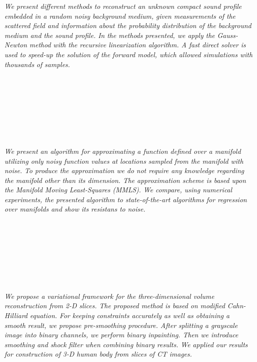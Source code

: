   \begin{multicols}{2}
    \textit{We present different methods to reconstruct an unknown compact sound profile embedded in a random noisy background medium, given measurements of the scattered field and information about the probability distribution of the background medium and the sound profile. In the methods presented, we apply the Gauss-Newton method with the recursive linearization algorithm. A fast direct solver is used to speed-up the solution of the forward model, which allowed simulations with thousands of samples.}\\
\\ 
      \\
      \\\\
      \\
      \\\\
\\
    \textit{We present an algorithm for approximating a function defined over a manifold utilizing only noisy function values at locations sampled from the manifold with noise. To produce the approximation we do not require any knowledge regarding the manifold other than its dimension. The approximation scheme is based upon the Manifold Moving Least-Squares (MMLS). We compare, using numerical experiments, the presented algorithm to state-of-the-art algorithms for regression over manifolds and show its resistans to noise.}\\
\\ 
      \\
      \\\\
      \\
      \\\\
\\
    \textit{We propose a variational framework for the three-dimensional volume reconstruction from 2-D slices. The proposed method is based on modified Cahn-Hilliard equation. For keeping constraints accurately as well as obtaining a smooth result, we propose pre-smoothing procedure. After splitting a grayscale image into binary channels, we perform binary inpainting. Then we introduce smoothing and shock filter when combining binary results. We applied our results for construction of 3-D human body from slices of CT images.}\\

\end{multicols}
